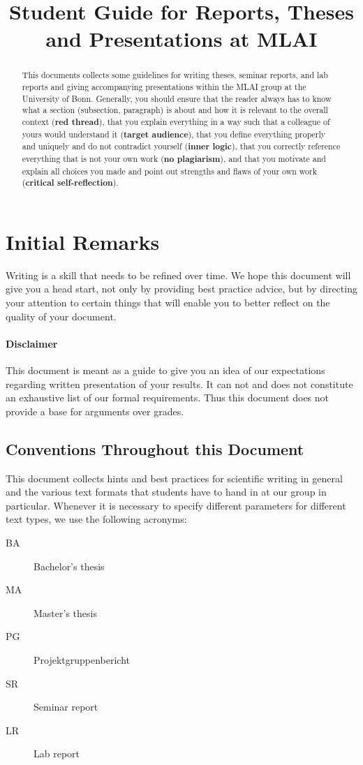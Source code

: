 \documentclass[twocolumn]{mlai-guide}
\date{} %
\title{Student Guide for Reports, Theses and Presentations at MLAI}
\begin{document}
\maketitle

\begin{abstract}
	This documents collects some guidelines for writing theses, seminar reports, and lab reports and giving accompanying presentations within the MLAI group at the University of Bonn.
	Generally, you should ensure that
	the reader always has to know what a section (subsection, paragraph) is about and how it is relevant to the overall context (\textbf{red thread}), that you explain everything in a way such that a colleague of yours would understand it (\textbf{target audience}), that you define everything properly and uniquely and do not contradict yourself (\textbf{inner logic}), that you correctly reference everything that is not your own work (\textbf{no plagiarism}), and that you motivate and explain all choices you made and point out strengths and flaws of your own work (\textbf{critical self-reflection}).

\end{abstract}

\tableofcontents


\section{Initial Remarks}
Writing is a skill that needs to be refined over time. We hope this document will give you a head start, not only by providing best practice advice, but by directing your attention to certain things that will enable you to better reflect on the quality of your document.

\paragraph{Disclaimer} This document is meant as a guide to give you an idea of our expectations regarding written presentation of your results. It can not and does not constitute an exhaustive list of our formal requirements. Thus this document does not provide a base for arguments over grades.

\subsection{Conventions Throughout this Document}
This document collects hints and best practices for scientific writing in general and the various text formats that students have to hand in at our group in particular.
Whenever it is necessary to specify different parameters for different text types, we use the following acronyms:
\begin{description}
\item[BA] Bachelor's thesis
\item[MA] Master's thesis
\item[PG] Projektgruppenbericht
\item[SR] Seminar report
\item[LR] Lab report
\end{description}
\end{document}

